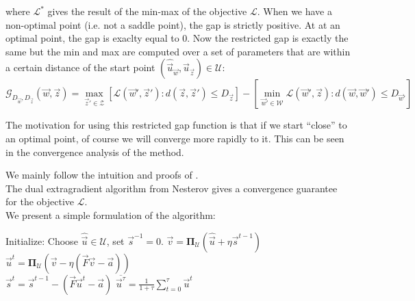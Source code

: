where $\mathcal{L}^*$ gives the result of the min-max of the objective
$\mathcal{L}$. When we have a non-optimal point (i.e. not a saddle point), the
gap is strictly positive. At at an optimal point, the gap is exaclty equal to 0.
Now the restricted gap is exactly the same but the min and max are computed over
a set of parameters that are within a certain distance of the start point
$(\hat{\vec u}_{\vec w},\hat{\vec u}_{\vec z}) \in \mathcal{U}$:
\begin{equation}
  \mathcal{G}_{D_{\vec w}, D_{\vec z}}(\vec w, \vec z) = \max_{\vec z' \in
\mathcal{Z}} \left[ \mathcal{L}(\vec w', \vec z') : d(\vec z, \vec z') \leq
D_{\vec z} \right] - \left [ \min_{\vec w' \in \mathcal{W}} \mathcal{L}(\vec w',
\vec z) : d(\vec w, \vec w') \leq D_{\vec w'} \right ]
\end{equation}

The motivation for using this restricted gap function is that if we start
``close'' to an optimal point, of course we will converge more rapidly to it.
This can be seen in the convergence analysis of the method.






We mainly follow the intuition and proofs of \cite{taskarStructuredPredictionExtragradient}.\\
The dual extragradient algorithm from Nesterov gives a convergence guarantee for
the objective $\mathcal{L}$.\\
We present a simple formulation of the algorithm:
\begin{algorithmic}
  \STATE Initialize: Choose $\hat{\vec u} \in \mathcal{U}$, set $\vec s^{-1} = 0$.
  \STATE $\vec v = \mathbf{\Pi}_{\mathcal{U}}(\hat{\vec u} + \eta \vec s^{t-1})$\\
  \STATE $\vec u^t = \mathbf{\Pi}_{\mathcal{U}}(\vec v - \eta (\vec F \vec v - \vec a))$\\
  \STATE $\vec s^t =  \vec s^{t-1} - (\vec F \vec u^t - \vec a)$
  \ENDFOR
  \RETURN $\overline{\vec u^{\tau}} = \frac{1}{1 + \tau} \sum_{t=0}^{\tau} \vec u^t$
\end{algorithmic}

